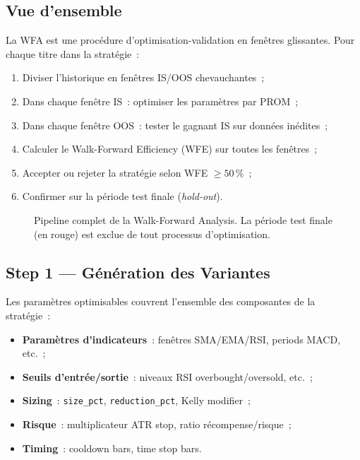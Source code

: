 \subsection{Vue d'ensemble}

La WFA est une procédure d'optimisation-validation en fenêtres glissantes. Pour
chaque titre dans la stratégie~:

\begin{enumerate}
    \item Diviser l'historique en fenêtres IS/OOS chevauchantes~;
    \item Dans chaque fenêtre IS~: optimiser les paramètres par PROM~;
    \item Dans chaque fenêtre OOS~: tester le gagnant IS sur données inédites~;
    \item Calculer le Walk-Forward Efficiency (WFE) sur toutes les fenêtres~;
    \item Accepter ou rejeter la stratégie selon WFE $\geq 50\,\%$~;
    \item Confirmer sur la période test finale (\textit{hold-out}).
\end{enumerate}

\begin{figure}[H]
\centering
{}
\caption{Pipeline complet de la Walk-Forward Analysis.
La période test finale (en rouge) est exclue de tout processus d'optimisation.}
\label{fig:wfo_pipeline}
\end{figure}

\subsection{Step 1 --- Génération des Variantes}

Les paramètres optimisables couvrent l'ensemble des composantes de la stratégie~:

\begin{itemize}
    \item \textbf{Paramètres d'indicateurs}~: fenêtres SMA/EMA/RSI, periods MACD, etc.~;
    \item \textbf{Seuils d'entrée/sortie}~: niveaux RSI overbought/oversold, etc.~;
    \item \textbf{Sizing}~: \texttt{size\_pct}, \texttt{reduction\_pct}, Kelly modifier~;
    \item \textbf{Risque}~: multiplicateur ATR stop, ratio récompense/risque~;
    \item \textbf{Timing}~: cooldown bars, time stop bars.
\end{itemize}

